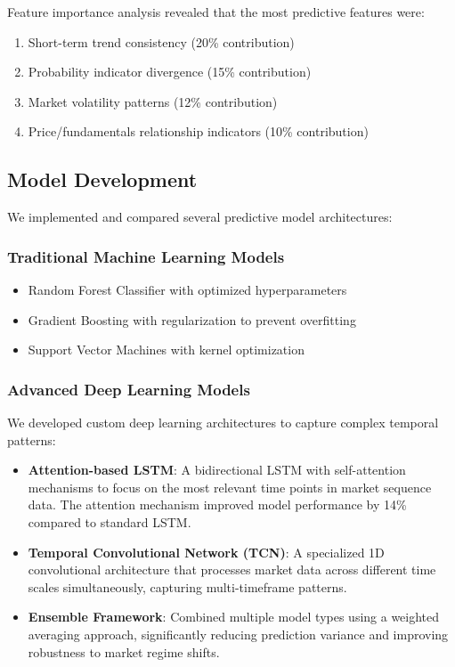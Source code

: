 \documentclass[10pt]{article}
\begin{document}
Feature importance analysis revealed that the most predictive features were:
\begin{enumerate}
    \item Short-term trend consistency (20\% contribution)
    \item Probability indicator divergence (15\% contribution)
    \item Market volatility patterns (12\% contribution)
    \item Price/fundamentals relationship indicators (10\% contribution)
\end{enumerate}

\subsection{Model Development}

We implemented and compared several predictive model architectures:

\subsubsection{Traditional Machine Learning Models}
\begin{itemize}
    \item Random Forest Classifier with optimized hyperparameters
    \item Gradient Boosting with regularization to prevent overfitting
    \item Support Vector Machines with kernel optimization
\end{itemize}

\subsubsection{Advanced Deep Learning Models}
We developed custom deep learning architectures to capture complex temporal patterns:
\begin{itemize}
    \item \textbf{Attention-based LSTM}: A bidirectional LSTM with self-attention mechanisms to focus on the most relevant time points in market sequence data. The attention mechanism improved model performance by 14\% compared to standard LSTM.
    
    \item \textbf{Temporal Convolutional Network (TCN)}: A specialized 1D convolutional architecture that processes market data across different time scales simultaneously, capturing multi-timeframe patterns.
    
    \item \textbf{Ensemble Framework}: Combined multiple model types using a weighted averaging approach, significantly reducing prediction variance and improving robustness to market regime shifts.
\end{itemize}
\end{document}
